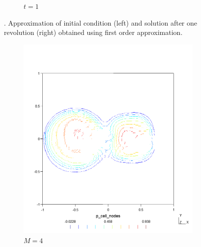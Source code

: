 \begin{figure}[h!]
\begin{subfigure}{.5\textwidth}
        \caption{$t = 1$}
    \end{subfigure}
    \caption{.  Approximation of initial condition (left) and 
    solution after one revolution (right) obtained using first order approximation.}
    \label{fig:sol_3D_adv2D}
\end{figure}

\begin{figure}[p!]
    \centering
    \begin{subfigure}{.5\textwidth}	
        \centering	
        \includegraphics[width=\linewidth]{../figs/sols/kriv-sol-h2304o04}
        \caption{$M=4$}
    \end{subfigure}%
    \begin{subfigure}{.5\textwidth}
        \centering	

\end{subfigure}
\end{figure}
